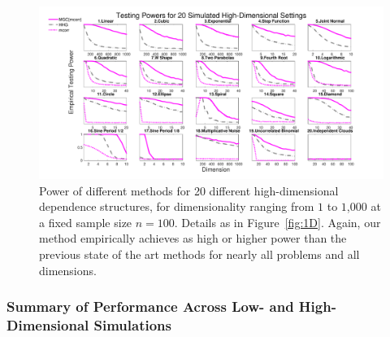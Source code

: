 \documentclass[11pt]{article}
\begin{document}
\begin{figure}[htbp]
\includegraphics[width=1.0\textwidth]{Figures/FigHDPower}
\caption{Power of different methods for 20 different high-dimensional dependence structures, for dimensionality ranging from $1$ to $1$,$000$ at a fixed sample size $n=100$.  Details as in Figure~\ref{fig:1D}.
Again, our method empirically achieves as high or higher power than the previous state of the art methods for nearly all problems and all dimensions.
}
\label{fig:nD}
\end{figure}


\subsubsection{Summary of Performance Across Low- and High-Dimensional Simulations}
\end{document}
